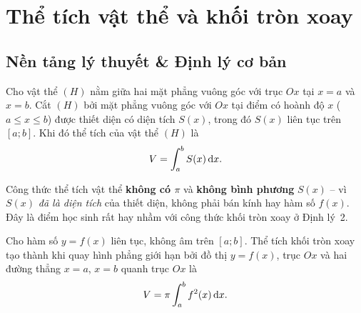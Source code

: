\section{Thể tích vật thể và khối tròn xoay}

\subsection{Nền tảng lý thuyết \& Định lý cơ bản}

\begin{hopdinhly}[Định lý]
Cho vật thể $(H)$ nằm giữa hai mặt phẳng vuông góc với trục $Ox$ tại $x=a$ và $x=b$. Cắt $(H)$ bởi mặt phẳng vuông góc với $Ox$ tại điểm có hoành độ $x$ ($a\le x\le b$) được thiết diện có diện tích $S(x)$, trong đó $S(x)$ liên tục trên $[a;b]$. Khi đó thể tích của vật thể $(H)$ là
\[
V = \int_a^b S(x)\,\mathrm{d}x.
\]
\end{hopdinhly}

\begin{hopchuy}
Công thức thể tích vật thể \textbf{không có $\pi$} và \textbf{không bình phương} $S(x)$ -- vì $S(x)$ \emph{đã là diện tích} của thiết diện, không phải bán kính hay hàm số $f(x)$. Đây là điểm học sinh rất hay nhầm với công thức khối tròn xoay ở Định lý~2.
\end{hopchuy}

\begin{center}
\end{center}

\begin{hopdinhly}[Định lý]
Cho hàm số $y=f(x)$ liên tục, không âm trên $[a;b]$. Thể tích khối tròn xoay tạo thành khi quay hình phẳng giới hạn bởi đồ thị $y=f(x)$, trục $Ox$ và hai đường thẳng $x=a$, $x=b$ quanh trục $Ox$ là
\[
V = \pi\int_a^b f^2(x)\,\mathrm{d}x.
\]
\end{hopdinhly}

